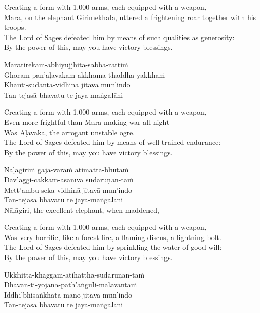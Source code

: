 \begin{english-verses}
  Creating a form with 1,000 arms, each equipped with a weapon,\\
  Mara, on the elephant Girimekhala, uttered a frightening roar together with his troops.\\
  The Lord of Sages defeated him by means of such qualities as generosity:\\
  By the power of this, may you have victory blessings.
\end{english-verses}

Mārātirekam-abhiyujjhita-sabba-rattiṁ\\
Ghoram-pan'āḷavakam-akkhama-thaddha-yakkhaṁ\\
Khantī-sudanta-vidhinā jitavā mun'indo\\
Tan-tejasā bhavatu te jaya-maṅgalāni

\begin{english-verses}
  Creating a form with 1,000 arms, each equipped with a weapon,\\
  Even more frightful than Mara making war all night\\
  Was Āḷavaka, the arrogant unstable ogre.\\
  The Lord of Sages defeated him by means of well-trained endurance:\\
  By the power of this, may you have victory blessings.
\end{english-verses}

Nāḷāgiriṁ gaja-varaṁ atimatta-bhūtaṁ\\
Dāv'aggi-cakkam-asanīva sudāruṇan-taṁ\\
Mett'ambu-seka-vidhinā jitavā mun'indo\\
Tan-tejasā bhavatu te jaya-maṅgalāni\\
Nāḷāgiri, the excellent elephant, when maddened,

\begin{english-verses}
  Creating a form with 1,000 arms, each equipped with a weapon,\\
  Was very horrific, like a forest fire, a flaming discus, a lightning bolt.\\
  The Lord of Sages defeated him by sprinkling the water of good will:\\
  By the power of this, may you have victory blessings.
\end{english-verses}

Ukkhitta-khaggam-atihattha-sudāruṇan-taṁ\\
Dhāvan-ti-yojana-path'aṅguli-mālavantaṁ\\
Iddhī'bhisaṅkhata-mano jitavā mun'indo\\
Tan-tejasā bhavatu te jaya-maṅgalāni

